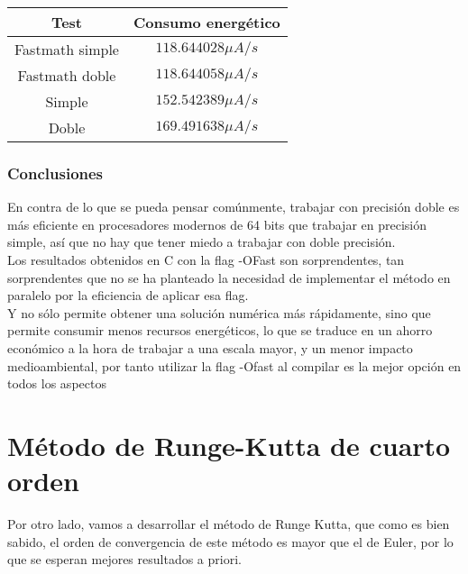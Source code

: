 \begin{ejemplo}
\begin{table}[H]
	\centering
	\begin{tabular}{|c|c|}
		\hline
		\textbf{Test}  & \textbf{Consumo energético}        \\ \hline
		Fastmath simple & $118.644028 \mu A/s$ \\ 
		Fastmath doble   & $118.644058 \mu A/s$ \\
		Simple & $ 152.542389 \mu A/s$ \\
		Doble & $ 169.491638 \mu A/s$ \\
		\hline
	\end{tabular}%
\end{table}
\subsubsection{Conclusiones}
En contra de lo que se pueda pensar comúnmente, trabajar con precisión doble es más eficiente en procesadores modernos de 64 bits que trabajar en precisión simple, así que no hay que tener miedo a trabajar con doble precisión. \\
Los resultados obtenidos en C con la flag -OFast son sorprendentes, tan sorprendentes que no se ha planteado la necesidad  de implementar el método en paralelo por la eficiencia de aplicar esa flag.
\\
Y no sólo permite obtener una solución numérica más rápidamente, sino que permite consumir menos recursos energéticos, lo que se traduce en un ahorro económico a la hora de trabajar a una escala mayor, y un menor impacto medioambiental, por tanto utilizar la flag -Ofast al compilar es la mejor opción en todos los aspectos
\end{ejemplo}

\section{Método de Runge-Kutta de cuarto orden}
Por otro lado, vamos a desarrollar el método de Runge Kutta, que como es bien sabido, el orden de convergencia de este método es mayor que el de Euler, por lo que se esperan mejores resultados a priori.

